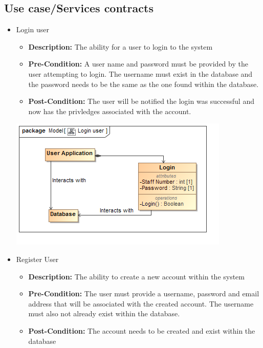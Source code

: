 \documentclass[11pt]{article}
\begin{document}
	\subsection{Use case/Services contracts}
	\begin{itemize}
		\item Login user
		\begin{itemize}
			\item \textbf{Description: }The ability for a user to login to the system
			\item \textbf{Pre-Condition: }A user name and password must be provided by the user attempting to login. The username must exist in the database and the password needs to be the same as the one found within the database. 
			\item \textbf{Post-Condition: }The user will be notified the login was successful and now has the privledges associated with the account.
		\end{itemize}
		\begin{center}
			\includegraphics[width=\textwidth]{../DomainModel/Loginuser.png}\\[0.5cm]
		\end{center}
		\item Register User
		\begin{itemize}
			\item \textbf{Description: }The ability to create a new account within the system
			\item \textbf{Pre-Condition: }The user must provide a username, password and email address that will be associated with the created account. The username must also not already exist within the database. 
			\item \textbf{Post-Condition: }The account needs to be created and exist within the database

\end{itemize}
\end{itemize}
\end{document}
